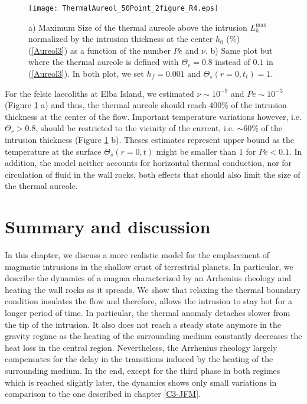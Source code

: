 \begin{figure}[h!]
  \begin{center}
    \graphicspath{ {/Users/thorey/Documents/These/Projet/Refroidissement/Skin_Model/Figure/Figure_Heating/} }
    \texttt{[image: ThermalAureol\_50Point\_2figure\_R4.eps]}
    \caption{a)  Maximum  Size  of   the  thermal  aureole  above  the
      intrusion   $L_h^{\text{max}}$  normalized   by  the   intrusion
      thickness  at  the  center  $h_0$ ($\%$)  (\ref{Aureol3})  as  a
      function of the  number $Pe$ and $\nu$.  b) Same  plot but where
      the thermal  aureole is  defined with $\Theta_r=0.8$  instead of
      $0.1$ in (\ref{Aureol3}).  In both plot, we set $h_f=0.001$ and
      $\Theta_s(r=0,t_{t})=1$.}
    \label{PhaseHeatingContact}
  \end{center}
\end{figure}

For   the   felsic   laccoliths   at   Elba   Island,   we   estimated
$\nu     \sim     10^{-9}$     and    $Pe\sim     10^{-3}$     (Figure
\ref{PhaseHeatingContact}  a) and  thus,  the  thermal aureole  should
reach  $400\%$  of  the  intrusion  thickness at  the  center  of  the
flow. Important  temperature variations however,  i.e. $\Theta_r>0.8$,
should be restricted to the vicinity of the current, i.e.  $\sim 60\%$
of  the  intrusion  thickness  (Figure  \ref{PhaseHeatingContact}  b).
Theses  estimates represent  upper  bound as  the  temperature at  the
surface $\Theta_s(r=0,t)$ might be smaller  than $1$ for $Pe<0.1$.  In
addition,   the  model   neither  accounts   for  horizontal   thermal
conduction,  nor for  circulation of  fluid  in the  wall rocks,  both
effects that should also limit the size of the thermal aureole.


\section{Summary and discussion}
\label{sec:discussion}

In this chapter, we discuss a more realistic model for the emplacement
of magmatic intrusions in the shallow crust of terrestrial planets. In
particular, we  describe the dynamics  of a magma characterized  by an
Arrhenius rheology and heating the wall  rocks as it spreads.  We show
that relaxing  the thermal boundary  condition insulates the  flow and
therefore, allows  the intrusion to  stay hot  for a longer  period of
time.  In particular, the thermal anomaly detaches slower from the tip
of the  intrusion.  It also does  not reach a steady  state anymore in
the gravity regime as the heating of the surrounding medium constantly
decreases  the heat  loss in  the central  region.  Nevertheless,  the
Arrhenius  rheology   largely  compensates   for  the  delay   in  the
transitions induced by the heating  of the surrounding medium.  In the
end,  except for  the third  phase in  both regimes  which is  reached
slightly later, the dynamics shows only small variations in comparison
to the one described in chapter \ref{C3-JFM}.

